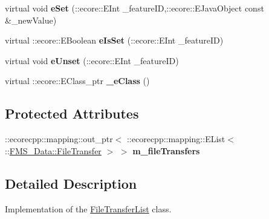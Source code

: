 \begin{DoxyCompactItemize}
\item 
\hypertarget{classFMS__Data_1_1FileTransferList_aed47c1eb4147420f071c672deb48fb2c}{
virtual void {\bfseries eSet} (::ecore::EInt \_\-featureID,::ecore::EJavaObject const \&\_\-newValue)}
\label{classFMS__Data_1_1FileTransferList_aed47c1eb4147420f071c672deb48fb2c}

\item 
\hypertarget{classFMS__Data_1_1FileTransferList_a2419e03195b947e51a887cb7d24d0467}{
virtual ::ecore::EBoolean {\bfseries eIsSet} (::ecore::EInt \_\-featureID)}
\label{classFMS__Data_1_1FileTransferList_a2419e03195b947e51a887cb7d24d0467}

\item 
\hypertarget{classFMS__Data_1_1FileTransferList_a09e58d61702bed9329af8993ac608940}{
virtual void {\bfseries eUnset} (::ecore::EInt \_\-featureID)}
\label{classFMS__Data_1_1FileTransferList_a09e58d61702bed9329af8993ac608940}

\item 
\hypertarget{classFMS__Data_1_1FileTransferList_ab0de6de3e6058b0b7385e33e221de42f}{
virtual ::ecore::EClass\_\-ptr {\bfseries \_\-eClass} ()}
\label{classFMS__Data_1_1FileTransferList_ab0de6de3e6058b0b7385e33e221de42f}

\end{DoxyCompactItemize}
\subsection*{Protected Attributes}
\begin{DoxyCompactItemize}
\item 
\hypertarget{classFMS__Data_1_1FileTransferList_a2eab4c7f9d3f5e8200a504dced245f3d}{
::ecorecpp::mapping::out\_\-ptr$<$ ::ecorecpp::mapping::EList$<$ ::\hyperlink{classFMS__Data_1_1FileTransfer}{FMS\_\-Data::FileTransfer} $>$ $>$ {\bfseries m\_\-fileTransfers}}
\label{classFMS__Data_1_1FileTransferList_a2eab4c7f9d3f5e8200a504dced245f3d}

\end{DoxyCompactItemize}


\subsection{Detailed Description}
Implementation of the \hyperlink{classFMS__Data_1_1FileTransferList}{FileTransferList} class. 

